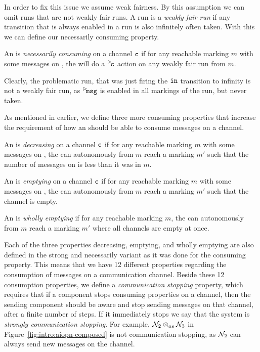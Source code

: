 In order to fix this issue we assume weak fairness. By this assumption we can omit runs that are not weakly fair runs. A run is a \emph{weakly fair run} if any transition that is always enabled in a run is also infinitely often taken. With this we can define our necessarily consuming property.

\begin{definition}
    An \AIOPN is \emph{necessarily consuming} on a channel $\mathtt{c}$ if for any reachable marking $m$ with some messages on , the \AIOPN will do a $\inact{\transition{c}}$ action on any weakly fair run from $m$. 
\end{definition}

Clearly, the problematic run, that was just firing the $\mathtt{in}$ transition to infinity is not a weakly fair run, as $\inact{\transition{msg}}$ is enabled in all markings of the run, but never taken. 

As mentioned in earlier, we define three more consuming properties that increase the requirement of how an \AIOPN should be able to consume messages on a channel.

\begin{definition}[Decreasing]
    An \AIOPN is \emph{decreasing} on a channel $\mathtt{c}$ if for any reachable marking $m$ with some messages on , the \AIOPN can autonomously from $m$ reach a marking $m'$ such that the number of messages on  is less than it was in $m$.
\end{definition}

\begin{definition}[Emptying]
    An \AIOPN is \emph{emptying} on a channel $\mathtt{c}$ if for any reachable marking $m$ with some messages on , the \AIOPN can autonomously from $m$ reach a marking $m'$ such that the channel  is empty.
\end{definition}

\begin{definition}
    An \AIOPN is \emph{wholly emptying} if for any reachable marking $m$, the \AIOPN can autonomously from $m$ reach a marking $m'$ where all channels are empty at once.
\end{definition}

Each of the three properties decreasing, emptying, and wholly emptying are also defined in the strong and necessarily variant as it was done for the consuming property. This means that we have 12 different properties regarding the consumption of messages on a communication channel. Beside these 12 consumption properties, we define a \emph{communication stopping} property, which requires that if a component stops consuming properties on a channel, then the sending component should be aware and stop sending messages on that channel, after a finite number of steps. If it immediately stops we say that the system is \emph{strongly communication stopping}. For example, $\mathcal{N}_2 \otimes_{as} \mathcal{N}_3$ in Figure~\ref{fig:intro:aiopn-composed} is not communication stopping, as $\mathcal{N}_2$ can always send new messages on the channel. 


